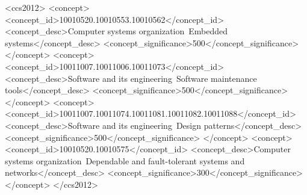 \documentclass[sigconf]{acmart}
\begin{document}
%
%
\begin{CCSXML}
<ccs2012>
 <concept>
  <concept_id>10010520.10010553.10010562</concept_id>
  <concept_desc>Computer systems organization~Embedded systems</concept_desc>
  <concept_significance>500</concept_significance>
 </concept>
  <concept>
<concept_id>10011007.10011006.10011073</concept_id>
<concept_desc>Software and its engineering~Software maintenance tools</concept_desc>
<concept_significance>500</concept_significance>
</concept>
 <concept>
<concept_id>10011007.10011074.10011081.10011082.10011088</concept_id>
<concept_desc>Software and its engineering~Design patterns</concept_desc>
<concept_significance>500</concept_significance>
</concept>
  <concept>
<concept_id>10010520.10010575</concept_id>
<concept_desc>Computer systems organization~Dependable and fault-tolerant systems and networks</concept_desc>
<concept_significance>300</concept_significance>
</concept>
</ccs2012>  
\end{CCSXML}




\maketitle




 
\end{document}
